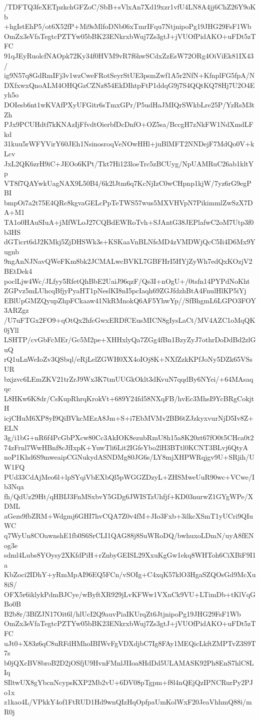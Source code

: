 /TDFTQ3feXETpzkchGFZoC/SbB+sVlxAn7Xd19xzr1vfU4LN8A4jj6ChZ26Y9oKb
+hgIstEhP5/ot6X52fP+Mi9sMlfoDNb06xTmrIFqu7NtjnipoPg19JHG29FsF1Wb
OmZx3eVfaTegtcPZTYw05bBK23ENkrxbWuj7Zs3gtJ+jVUOfPidAKO+uFDt5zTFC
91qJEyRuolcfNAOpk72Ky34f0HVM9vR7f6hwSCdxZzEsW72ORg4OiViEk81IX43/
ig9N57q8GdRmIFj3v1wzCweFRotSeyrStUE3psmZwf1A5r2NfN+KfnplFG5fpA/N
DXfxwxQnoALM4OHQGzCZNz854EkDIhtpFtP1ddqG9j7S4QQtKQ78Hj7U2O4Eyh5o
DOIesb6nt1wKVAfPXyUFGitr6sTmxGPr/P5udHaJMIQrSWkbLre25P/YzRsM3tZh
PJx9PCUHdtf7kKNAzIjFfvdtOierbfDcDnfO+OZ5sa/BccgH7zNkFW1NdXmdLFkd
31kuu5rWFYVirY60JEh1NsinosroqVeNOwHHl+juBlMFT2NNDejF7MdQo0V+kLcv
JxL2QK6zrH9iC+JEOo6KPt/Tkt7Hi123loeTrc5zBCUyg/NpUAMRuC26ab1kltYp
VT8f7QAYwkUagNAX9L50B4/6k2lJtm6q7KcNjIzC0wCHpnp1kjW/7yz6rG9egPBI
bmpOi7a2t75E4QRc8kgvaGELcPpTeTWS57wus5MXVHVpN7PikimmlZwSzX7DA+M1
TA1o0HAuSIuA+jMfWLoJ27CQBdEWRoTvh+SJAntG38JEPlafwC2oM7Utp3f0b3HS
dGTicrt6dJ2KMkj5ZjDHSWk3s+KSKaaVnBLNfsMD4zVMDWjQcC5Ii4D6Mx9Yugnb
9ngAnNJNavQWeFKm8bk2JCMALwcBVKL7GBFHrI5HYjZyWh7edQxKOzjV2BEtDek4
poclLjw4Wc/JLfyy5RfetQhBbE2UaiJ96qzF/Qs3I+nOgU+/0tsfn14PYPdNoKht
ZGPvz5mLUhcqBfjyPyaHT1pNeslKI8nI5pcIaqh69ZGJfdzhBtA4FnulHlKP5iYj
EBlUpGMZQyupZhpFCkaaw41NkRMnokQ6AF5YhwYp//SfBhgmL6LGPO3FOY3ARZgz
/U7uFTGx2FO9+qOtQx2hfcGwxERDfCEusMICN8gIysLaCt/MV4AZC1oMqQK0jYll
LSHTP/cvGbFcMEr/Gc5M2pe+XHHxlyQa7ZGg4fBn1BzyZyJ7othrDoDdBd2zlGuQ
rQ1uLnWeIoZv3QSbql/eRjLelZGWH0XX4oIOj8K+NXfZzkKPfJoNy5DZk65VSsUR
bxjzvc6LEmZKV21trZrJ9Wx3K7tmUUGkOklt3dKvuN7qqdBy6NYei/+64MAsaqqc
L8HKw6K8dr/CsKupRhrqKrokVt+689Y24fd58NXqFB/hvEc3MhsI9YcBRgCokjtH
icjCHuM6XP8yI9QiBVkcMEzA8Jm+S+i7EbMVMv2BB6tZJzkyxvurNjD5Iv8Z+ELN
3g/i1bG+nR6f4PcGbPXcw80Cc3AkIOK8ezubRmU8h15a8K20zt67fO0t5CHca0t2
74zFrnl7WwHBnf8cJfIxpK+YuwTli6Lit2IGfeYbo2lH3BTtl0KCNT3BLvj6QtyA
noP1Khd6S9mweaipCGNukydASNDMg80JG6s/LY8mjXHPWRqjgv9U+SRjih/UW1FQ
PUd33CdAjMeo6l+lpSYqiVbEXbQl5pWGGZDzyL+ZHSMweUuR90wc+VCwe/Ib3Nqa
fh/QdUz29Ht/qHBIJ3FnMSxbvY5GDg6JWISTzUhfjf+KD03nurwZ1GYgWPe/XDML
aGezs9fbZRM+Wdgmj6GHI7hvCQA7Z0v4fM+JIo3Fxb+3ilkcXSmT1yUCri9QIuWC
q7WyUn8COawnshE1fb0S6SrCLI1QAG88j8SuWRoDQ/bwhuxoLDmN/uyA8fENog3e
sdml4Lubs8YOysy2XKfdPiH+rZnbyGEISL29XxuKgGw1ekq8WHToh6CiXBiF9I1a
KbZoci2IDhY+yRmMpAI96EQ5FCn/vSOIg+C4xqK57klO3HgaSZQOsGd9McXu8iS/
OFX5r6iklykPdmBJCye/wByftXR929jLvKFWw1VXnCk9VU+LTimDb+tKlVqGBo0B
B2b8r/3BfZJN17Oit6l/hlUcI2Q9auvPiaIKUrqZt6JtjnipoPg19JHG29FsF1Wb
OmZx3eVfaTegtcPZTYw05bBK23ENkrxbWuj7Zs3gtJ+jVUOfPidAKO+uFDt5zTFC
uJt0+X83z6qC8uRFdHMhoIBIWvFgVDXdjbC7Ig8FAy1MEQicLkftZMPTvZ3S9T7s
b0jQXcBV8broB2D2jOSfjU9HvnFMnlJIIoa8HdDd5ULAMASK92Ph8EnS7hlC8LIq
SIltwUX8gYbcnNcypsKXP2Mb2vU+6DV08pTgpm+f8l4nQEjQzIPNCRurPy2PJo1x
z1kao4L/VPkkY4of1FtRUD1Hd9wnQIzHqOpfpaUmKolWxF20JeaVhhmQ88i/mR0j
